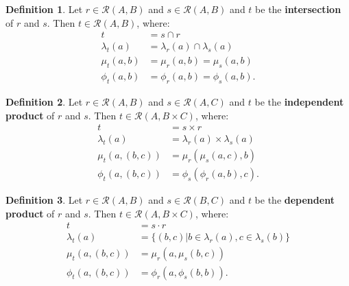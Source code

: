 \documentclass{article}
\theoremstyle{definition}
\newtheorem{definition}{Definition}[section]
\theoremstyle{plain}
\def\rule{\mathcal{R}}
\begin{document}
\begin{definition}
  Let $ r \in \rule (A, B) $
  and $ s \in \rule (A, B) $
  and $ t $ be the \textbf{intersection} of $ r $ and $ s $.
  Then $ t \in \rule (A, B) $, where:
  \begin{align}
            t        & = s \cap r \\
    \lambda_t (a)    & = \lambda_r (a) \cap \lambda_s (a) \\
        \mu_t (a, b) & = \mu_r  (a, b)    = \mu_s  (a, b) \\
       \phi_t (a, b) & = \phi_r (a, b)    = \phi_s (a, b).
  \end{align}
\end{definition}

\begin{definition}
  Let $ r \in \rule (A, B) $
  and $ s \in \rule (A, C) $
  and $ t $ be the \textbf{independent product} of $ r $ and $ s $.
  Then $ t \in \rule (A, B \times C) $, where:
  \begin{align}
            t             & = s \times r \\
    \lambda_t (a)         & = \lambda_r (a) \times \lambda_s (a) \\
        \mu_t (a, (b, c)) & =     \mu_r ( \mu_s (a, c), b) \\
       \phi_t (a, (b, c)) & =    \phi_s (\phi_r (a, b), c).
  \end{align}
\end{definition}

\begin{definition}
  Let $ r \in \rule (A, B) $
  and $ s \in \rule (B, C) $
  and $ t $ be the \textbf{dependent product} of $ r $ and $ s $.
  Then $ t \in \rule (A, B \times C) $, where:
  \begin{align}
            t             & = s \cdot r \\
    \lambda_t (a)         & = \{ (b, c) | b \in \lambda_r (a), c \in \lambda_s (b) \} \\
        \mu_t (a, (b, c)) & =     \mu_r (a,  \mu_s (b, c)) \\
       \phi_t (a, (b, c)) & =    \phi_r (a, \phi_s (b, b)).
  \end{align}
\end{definition}
\end{document}
